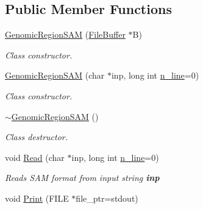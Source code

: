 \subsection*{Public Member Functions}
\begin{DoxyCompactItemize}
\item 
\hypertarget{classGenomicRegionSAM_ae6b0828926a573743e7292567346c1a1}{
\hyperlink{classGenomicRegionSAM_ae6b0828926a573743e7292567346c1a1}{GenomicRegionSAM} (\hyperlink{classFileBuffer}{FileBuffer} $\ast$B)}
\label{classGenomicRegionSAM_ae6b0828926a573743e7292567346c1a1}

\begin{DoxyCompactList}\small\item\em Class constructor. \end{DoxyCompactList}\item 
\hypertarget{classGenomicRegionSAM_a25247d97947a54583fb17d493df4a0cf}{
\hyperlink{classGenomicRegionSAM_a25247d97947a54583fb17d493df4a0cf}{GenomicRegionSAM} (char $\ast$inp, long int \hyperlink{classGenomicRegion_aefe2255aeed5338060190ded05cb9c0c}{n\_\-line}=0)}
\label{classGenomicRegionSAM_a25247d97947a54583fb17d493df4a0cf}

\begin{DoxyCompactList}\small\item\em Class constructor. \end{DoxyCompactList}\item 
\hypertarget{classGenomicRegionSAM_a1d11cc22134d13dbf67ffe4c7220888d}{
\hyperlink{classGenomicRegionSAM_a1d11cc22134d13dbf67ffe4c7220888d}{$\sim$GenomicRegionSAM} ()}
\label{classGenomicRegionSAM_a1d11cc22134d13dbf67ffe4c7220888d}

\begin{DoxyCompactList}\small\item\em Class destructor. \end{DoxyCompactList}\item 
\hypertarget{classGenomicRegionSAM_a096d90b6743400daf1acb50bcf17086a}{
void \hyperlink{classGenomicRegionSAM_a096d90b6743400daf1acb50bcf17086a}{Read} (char $\ast$inp, long int \hyperlink{classGenomicRegion_aefe2255aeed5338060190ded05cb9c0c}{n\_\-line}=0)}
\label{classGenomicRegionSAM_a096d90b6743400daf1acb50bcf17086a}

\begin{DoxyCompactList}\small\item\em Reads SAM format from input string {\bfseries inp} \end{DoxyCompactList}\item 
\hypertarget{classGenomicRegionSAM_a4381c6486f767b6e4055cb729beee181}{
void \hyperlink{classGenomicRegionSAM_a4381c6486f767b6e4055cb729beee181}{Print} (FILE $\ast$file\_\-ptr=stdout)}
\label{classGenomicRegionSAM_a4381c6486f767b6e4055cb729beee181}


\end{DoxyCompactItemize}
